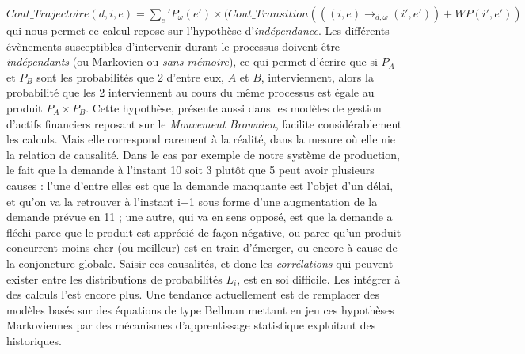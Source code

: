 $Cout\_Trajectoire(d, i, e) = \sum _e' P_\omega (e') \times (Cout\_Transition(((i, e) \rightarrow_{d,\omega} (i', e')) + WP(i', e'))$  qui nous permet ce calcul repose sur l'hypothèse d'\textit{indépendance}. Les différents évènements susceptibles d'intervenir durant le processus doivent être \textit{indépendants} (ou Markovien ou \textit{sans mémoire}), ce qui permet d'écrire que si $P_A$ et $P_B$ sont les probabilités que 2 d'entre eux, $A$ et $B$, interviennent, alors la probabilité que les 2 interviennent au cours du même processus est égale au produit $P_A\times P_B$.  Cette hypothèse, présente aussi dans les modèles de gestion d'actifs financiers reposant sur le \textit{Mouvement Brownien}, facilite considérablement les calculs. Mais elle correspond rarement à la réalité, dans la mesure où elle nie la relation de causalité.  Dans le cas par exemple de notre système de production, le fait que la demande à l'instant 10 soit 3 plutôt que 5 peut avoir plusieurs causes : l'une d'entre elles est que la demande manquante est l'objet d'un délai, et qu'on va la retrouver à l'instant i+1 sous forme d'une augmentation de la demande prévue en 11 ; une autre, qui va en sens opposé, est que la demande a fléchi parce que le produit est apprécié de façon négative, ou parce qu'un produit concurrent moins cher (ou meilleur) est en train d'émerger, ou encore à cause de la conjoncture globale. Saisir ces causalités, et donc les \textit{corrélations} qui peuvent exister entre les distributions de probabilités $L_i$, est en soi difficile. Les intégrer à des calculs l'est encore plus. Une tendance actuellement est de remplacer des modèles basés sur des équations de type Bellman mettant en jeu ces hypothèses Markoviennes par des mécanismes d'apprentissage statistique exploitant des historiques. 
